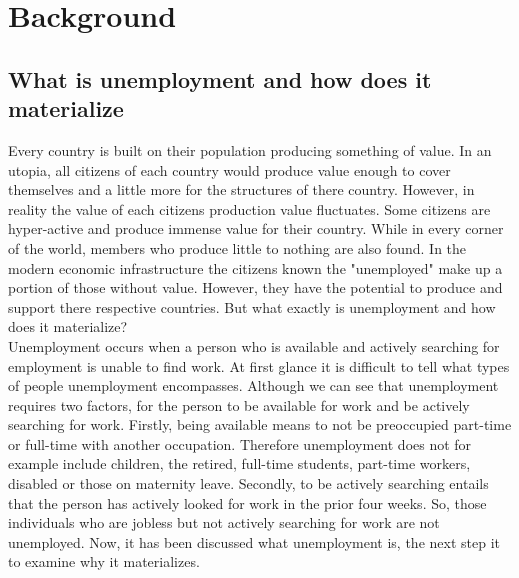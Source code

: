 \section{Background}\label{ch:background}

\subsection{What is unemployment and how does it materialize}
Every country is built on their population producing something of value. 
In an utopia, all citizens of each country would produce value enough to cover themselves and a little more for the structures of there country.
However, in reality the value of each citizens production value fluctuates. 
Some citizens are hyper-active and produce immense value for their country.
While in every corner of the world, members who produce little to nothing are also found. 
In the modern economic infrastructure the citizens known the "unemployed" make up a portion of those without value.
However, they have the potential to produce and support there respective countries.
But what exactly is unemployment and how does it materialize? \\

Unemployment occurs when a person who is available and actively searching for employment is unable to find work.\cite{Guide_to_unemployment} 
At first glance it is difficult to tell what types of people unemployment encompasses.
Although we can see that unemployment requires two factors, for the person to be available for work and be actively searching for work.
Firstly, being available means to not be preoccupied part-time or full-time with another occupation.
Therefore unemployment does not for example include children, the retired, full-time students, part-time workers, disabled or those on maternity leave.
Secondly, to be actively searching entails that the person has actively looked for work in the prior four weeks. \cite{US_unemployment_statistics_definition} 
So, those individuals who are jobless but not actively searching for work are not unemployed.
Now, it has been discussed what unemployment is, the next step it to examine why it materializes. \\

